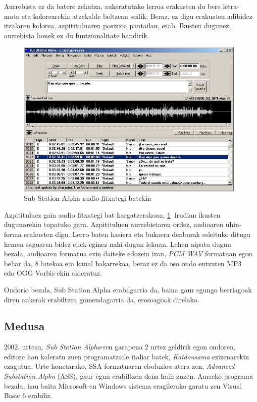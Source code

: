Aurrebista ez da batere zehatza, aukeratutako lerroa erakusten du bere letra-mota eta kolorearekin atzekalde beltzean soilik. Beraz, ez digu erakusten adibidez itzalaren kolorea, azpitituluaren posizioa pantailan, etab. Ikusten dugunez, aurrebista honek ez du funtzionalitate handirik.
\begin{figure}[htb]
\begin{center}
\includegraphics[width=\columnwidth, natwidth=789pt, natheight=540pt]{Pictures/Chapter2/ssa-audio.png}
\caption{Sub Station Alpha audio fitxategi batekin}
\label{ssa-audio}
\end{center}
\end{figure}

Azpitituluez gain audio fitxategi bat kargatzerakoan, \ref{ssa-audio}~Irudian ikusten dugunarekin topatuko gara. Azpitituluen aurrebistaren ordez, audioaren uhin-forma erakusten digu. Lerro baten hasiera eta bukaera denborak esleituko ditugu hemen saguaren bidez click eginez nahi dugun lekuan. Lehen aipatu dugun bezala, audioaren formatua ezin daiteke edozein izan, \textit{PCM WAV} formatuan egon behar da, 8 bitekoa eta kanal bakarrekoa, beraz ez da oso ondo entzuten MP3 edo OGG Vorbis-ekin alderatuz.

Ondorio bezala, Sub Station Alpha erabilgarria da, baina gaur egungo berriagoak diren aukerak erabiltzea gomendagarria da, erosoagoak direlako.

\subsection{Medusa}
2002. urtean, \textit{Sub Station Alpha}-ren garapena 2 urtez geldirik egon ondoren, editore hau kaleratu zuen programatzaile italiar batek, \textit{Kaidousama} ezizenarekin ezagutua. Urte honetarako, SSA formatuaren eboluzioa atera zen, \textit{Advanced Substation Alpha} (ASS), gaur egun erabiltzen dena hain zuzen. Aurreko programa bezala, hau baita Microsoft-en Windows sistema eragilerako garatu zen Visual Basic 6 erabiliz.

